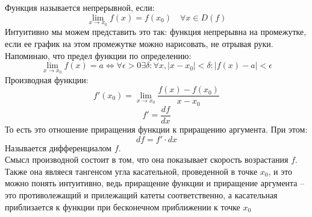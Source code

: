 \documentclass{article}
\begin{document}
\\
\\
Функция называется непрерывной, если:
\[\lim_{x \rightarrow x_0} f(x) = f(x_0) \quad \forall x \in D(f)\]
Интуитивно мы можем представить это так: функция непрерывна на промежутке, если ее график на этом промежутке можно нарисовать, не отрывая руки.
\\
Напоминаю, что предел функции по определению:
\[
\lim_{x \rightarrow x_0} f(x) = a
\Leftrightarrow
\forall \epsilon > 0 \exists \delta: \forall x, |x - x_0| < \delta: |f(x) - a| < \epsilon
\]
Производная функции:
\[
f'(x_0) = \lim_{x \rightarrow x_0}
\frac{f(x) - f(x_0)}{x - x_0}
\]
\[
f' = \frac{df}{dx}
\]
То есть это отношение приращения функции к приращению аргумента. При этом:
\[
df = f' \cdot dx
\]
Называется дифференциалом $f$.
\\
Смысл производной состоит в том, что она показывает скорость возрастания $f$. Также она являеся тангенсом угла касательной, проведенной в точке $x_0$, и это можно понять интуитивно, ведь приращение функции и приращение аргумента -- это противолежащий и прилежащий катеты соответственно, а касательная приблизается к функции при бесконечном приближении к точке $x_0$
\end{document}
